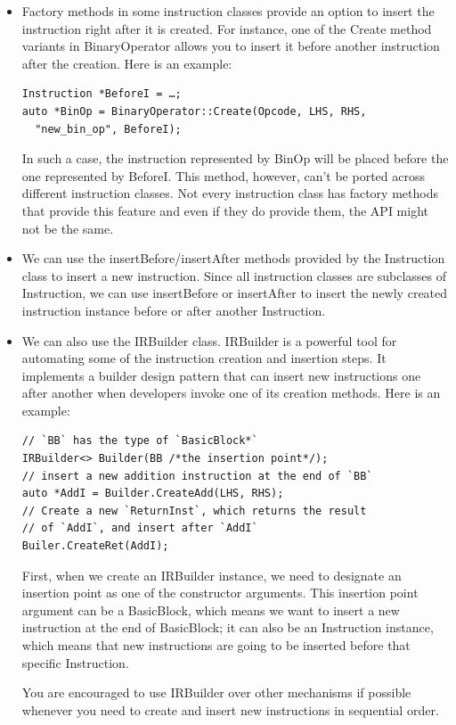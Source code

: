 \begin{itemize}
\item Factory methods in some instruction classes provide an option to insert the instruction right after it is created. For instance, one of the Create method variants in BinaryOperator allows you to insert it before another instruction after the creation. Here is an example:

\begin{lstlisting}[style=styleCXX]
Instruction *BeforeI = …;
auto *BinOp = BinaryOperator::Create(Opcode, LHS, RHS,
  "new_bin_op", BeforeI);
\end{lstlisting}

In such a case, the instruction represented by BinOp will be placed before the one represented by BeforeI. This method, however, can't be ported across different instruction classes. Not every instruction class has factory methods that provide this feature and even if they do provide them, the API might not be the same.

\item We can use the insertBefore/insertAfter methods provided by the Instruction class to insert a new instruction. Since all instruction classes are subclasses of Instruction, we can use insertBefore or insertAfter to insert the newly created instruction instance before or after another Instruction.
 
\item We can also use the IRBuilder class. IRBuilder is a powerful tool for automating some of the instruction creation and insertion steps. It implements a builder design pattern that can insert new instructions one after another when developers invoke one of its creation methods. Here is an example:

\begin{lstlisting}[style=styleCXX]
// `BB` has the type of `BasicBlock*`
IRBuilder<> Builder(BB /*the insertion point*/);
// insert a new addition instruction at the end of `BB`
auto *AddI = Builder.CreateAdd(LHS, RHS);
// Create a new `ReturnInst`, which returns the result
// of `AddI`, and insert after `AddI`
Builer.CreateRet(AddI);
\end{lstlisting}

First, when we create an IRBuilder instance, we need to designate an insertion point as one of the constructor arguments. This insertion point argument can be a BasicBlock, which means we want to insert a new instruction at the end of BasicBlock; it can also be an Instruction instance, which means that new instructions are going to be inserted before that specific Instruction.

You are encouraged to use IRBuilder over other mechanisms if possible whenever you need to create and insert new instructions in sequential order.

\end{itemize}

